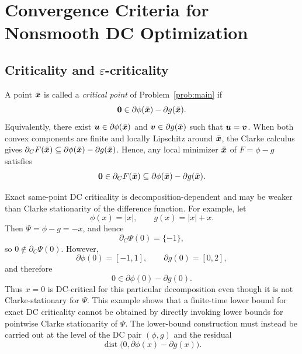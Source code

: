 \section{Convergence Criteria for Nonsmooth DC Optimization}
\label{sec:dc-convergence-criteria}

\subsection{Criticality and $\varepsilon$-criticality}
\label{sec:finite-time-barrier}
A point $\bar{\bm{x}}$ is called a \emph{critical point} of Problem~\eqref{prob:main} if
\begin{equation}
    \label{def:dc-critical}
    \bm{0}\in \partial\phi(\bar{\bm{x}})-\partial g(\bar{\bm{x}}).
\end{equation}
Equivalently, there exist $\bm{u}\in\partial\phi(\bar{\bm{x}})$ and $\bm{v}\in\partial g(\bar{\bm{x}})$ such that $\bm{u}=\bm{v}$. When both convex components are finite and locally Lipschitz around $\bar{\bm{x}}$, the Clarke calculus gives $\partial_C F(\bar{\bm{x}}) \subseteq \partial\phi(\bar{\bm{x}})-\partial g(\bar{\bm{x}})$. Hence, any local minimizer $\bar{\bm{x}}$ of $F=\phi-g$ satisfies
\[
    \bm{0}\in\partial_C F(\bar{\bm{x}}) \subseteq \partial\phi(\bar{\bm{x}})-\partial g(\bar{\bm{x}}).
\]

Exact same-point DC criticality is decomposition-dependent and may be
 weaker than Clarke stationarity of the difference function. For
example, let
\[
    \phi(x)=|x|,\qquad g(x)=|x|+x .
\]
Then \(\Psi=\phi-g=-x\), and hence
\[
    \partial_C\Psi(0)=\{-1\},
\]
so \(0\notin\partial_C\Psi(0)\). However,
\[
    \partial\phi(0)=[-1,1],\qquad \partial g(0)=[0,2],
\]
and therefore
\[
    0\in \partial\phi(0)-\partial g(0).
\]
Thus \(x=0\) is DC-critical for this particular decomposition even though
it is not Clarke-stationary for \(\Psi\). This example shows that a
finite-time lower bound for exact DC criticality cannot be obtained by
directly invoking lower bounds for pointwise Clarke stationarity of
\(\Psi\). The lower-bound construction must instead be carried out at the
level of the DC pair \((\phi,g)\) and the residual
\[
    \operatorname{dist}\bigl(0,\partial\phi(x)-\partial g(x)\bigr).
\]

